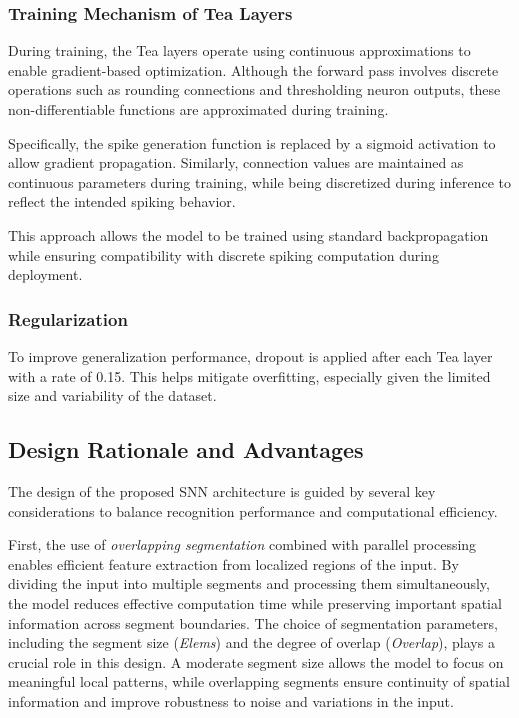 \documentclass[../main.tex]{subfiles}
\begin{document}
\subsubsection{Training Mechanism of Tea Layers}

During training, the Tea layers operate using continuous approximations to enable gradient-based optimization. Although the forward pass involves discrete operations such as rounding connections and thresholding neuron outputs, these non-differentiable functions are approximated during training.

Specifically, the spike generation function is replaced by a sigmoid activation to allow gradient propagation. Similarly, connection values are maintained as continuous parameters during training, while being discretized during inference to reflect the intended spiking behavior.

This approach allows the model to be trained using standard backpropagation while ensuring compatibility with discrete spiking computation during deployment.

\subsubsection{Regularization}

To improve generalization performance, dropout is applied after each Tea layer with a rate of 0.15. This helps mitigate overfitting, especially given the limited size and variability of the dataset.

\subsection{Design Rationale and Advantages}

The design of the proposed SNN architecture is guided by several key considerations to balance recognition performance and computational efficiency.

First, the use of \textit{overlapping segmentation} combined with parallel processing enables efficient feature extraction from localized regions of the input. By dividing the input into multiple segments and processing them simultaneously, the model reduces effective computation time while preserving important spatial information across segment boundaries. The choice of segmentation parameters, including the segment size (\textit{Elems}) and the degree of overlap (\textit{Overlap}), plays a crucial role in this design. A moderate segment size allows the model to focus on meaningful local patterns, while overlapping segments ensure continuity of spatial information and improve robustness to noise and variations in the input.
\end{document}

